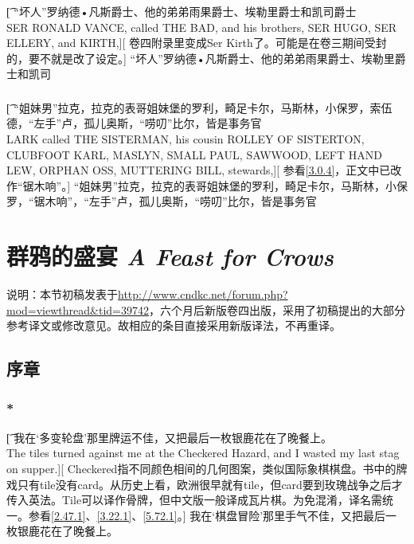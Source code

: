 \documentclass[12pt,a4paper]{article}
\begin{document}
\subsubsection{}\t[
	“坏人”{\large 罗纳德•凡斯爵士}、他的弟弟{\large 雨果爵士}、{\large 埃勒里爵士}和{\large 凯司爵士}\\
	SER RONALD VANCE, called THE BAD, and his brothers, SER HUGO, SER ELLERY, and KIRTH,][
	卷四附录里变成Ser Kirth了。可能是在卷三期间受封的，要不就是改了设定。]
{\large	“坏人”罗纳德•凡斯爵士}、他的弟弟{\large 雨果爵士}、{\large 埃勒里爵士}和{\large 凯司}
	
\subsubsection{}\t[
	“姐妹男”{\large 拉克}，拉克的表哥姐妹堡的{\large 罗利}，{\large 畸足卡尔}，{\large 马斯林}，{\large 小保罗}，{\large 索伍德}，{\large “左手”卢}，孤儿{\large 奥斯}，“唠叨”{\large 比尔}，皆是事务官\\
	LARK called THE SISTERMAN, his cousin ROLLEY OF SISTERTON, CLUBFOOT KARL, MASLYN, SMALL PAUL, SAWWOOD, LEFT HAND LEW, ORPHAN OSS, MUTTERING BILL, stewards,][
	参看\ref{3.0.4}，正文中已改作“锯木响”。]
{\large	“姐妹男”拉克}，拉克的表哥{\large 姐妹堡的罗利}，{\large 畸足卡尔}，{\large 马斯林}，{\large 小保罗}，{\large “锯木响”}，{\large “左手”卢}，{\large 孤儿奥斯}，{\large “唠叨”比尔}，皆是事务官
		
\newpage
\section{群鸦的盛宴 \emph{A Feast for Crows}}
说明：本节初稿发表于\url{http://www.cndkc.net/forum.php?mod=viewthread&tid=39742}，六个月后新版卷四出版，采用了初稿提出的大部分参考译文或修改意见。故相应的条目直接采用新版译法，不再重译。

\setcounter{subsection}{-1}
\subsection{序章}
\subsubsection{\color{red}*}\label{4.0.1}\t[
	我在‘多变轮盘’那里牌运不佳，又把最后一枚银鹿花在了晚餐上。\\
	The tiles turned against me at the Checkered Hazard, and I wasted my last stag on supper.][
	Checkered指不同颜色相间的几何图案，类似国际象棋棋盘。书中的牌戏只有tile没有card。从历史上看，欧洲很早就有tile，但card要到玫瑰战争之后才传入英法。Tile可以译作骨牌，但中文版一般译成瓦片棋。为免混淆，译名需统一。参看\ref{2.47.1}、\ref{3.22.1}、\ref{5.72.1}。]
	我在‘棋盘冒险’那里手气不佳，又把最后一枚银鹿花在了晚餐上。
	
\end{document}
